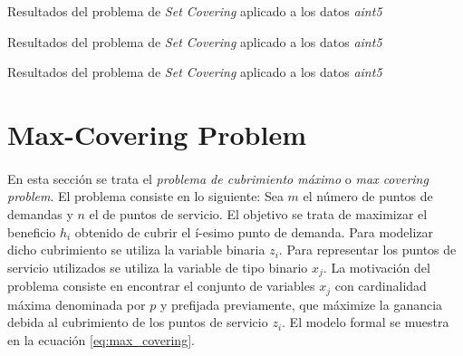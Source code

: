 \documentclass[spanish]{article}
\begin{document}
			\begin{table}[h]
				\begin{center}
				\end{center}
				\caption{Resultados del problema de \emph{Set Covering} aplicado a los datos \emph{aint5}}
				\label{table:sol-6.2b1}
			\end{table}

			\begin{table}[h]
				\begin{center}
				\end{center}
				\caption{Resultados del problema de \emph{Set Covering} aplicado a los datos \emph{aint5}}
				\label{table:sol-6.2b2}
			\end{table}

			\begin{table}[h]
				\begin{center}
				\end{center}
				\caption{Resultados del problema de \emph{Set Covering} aplicado a los datos \emph{aint5}}
				\label{table:sol-6.2b3}
			\end{table}

	\clearpage
	\section{Max-Covering Problem}
	\label{sec:e-7}

		\paragraph{}
		En esta sección se trata el \emph{problema de cubrimiento máximo} o \emph{max covering problem}. El problema consiste en lo siguiente: Sea $m$ el número de puntos de demandas y $n$ el de puntos de servicio. El objetivo se trata de maximizar el beneficio $h_i$ obtenido de cubrir el í-esimo punto de demanda. Para modelizar dicho cubrimiento se utiliza la variable binaria $z_i$. Para representar los puntos de servicio utilizados se utiliza la variable de tipo binario $x_j$. La motivación del problema consiste en encontrar el conjunto de variables $x_j$ con cardinalidad máxima denominada por $p$ y prefijada previamente, que máximize la ganancia debida al cubrimiento de los puntos de servicio $z_i$. El modelo formal se muestra en la ecuación \eqref{eq:max_covering}.
\end{document}
